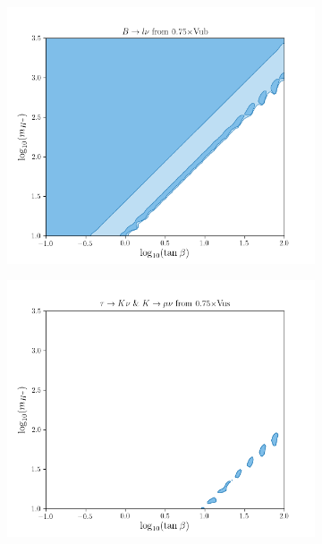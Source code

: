 \documentclass[11pt]{article}
\begin{document}
\begin{figure}[H]
\begin{subfigure}[b]{0.45\textwidth}
        \includegraphics[width=\textwidth]{vub/Blnu0.75.png}
    \end{subfigure}
    \begin{subfigure}[b]{0.45\textwidth}
        \includegraphics[width=\textwidth]{vus/Klnu0.75.png}
    \end{subfigure}
    \begin{subfigure}[b]{0.45\textwidth}

\end{subfigure}
\end{figure}
\end{document}

